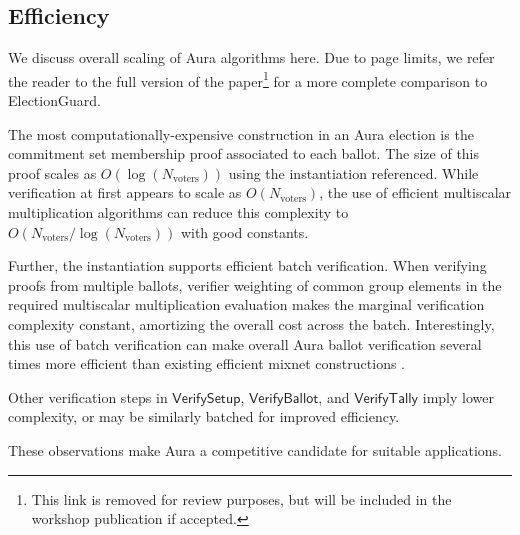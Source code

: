 \documentclass{llncs}
\newcommand{\func}[1]{\mathsf{#1}}
\begin{document}
\subsection{Efficiency}

We discuss overall scaling of Aura algorithms here.
Due to page limits, we refer the reader to the full version of the paper\footnote{This link is removed for review purposes, but will be included in the workshop publication if accepted.} for a more complete comparison to ElectionGuard.

The most computationally-expensive construction in an Aura election is the commitment set membership proof associated to each ballot.
The size of this proof scales as $O(\log(N_{\text{voters}}))$ using the instantiation referenced.
While verification at first appears to scale as $O(N_{\text{voters}})$, the use of efficient multiscalar multiplication algorithms \cite{pippenger} can reduce this complexity to $O(N_{\text{voters}}/\log(N_{\text{voters}}))$ with good constants.

Further, the instantiation supports efficient batch verification.
When verifying proofs from multiple ballots, verifier weighting of common group elements in the required multiscalar multiplication evaluation makes the marginal verification complexity constant, amortizing the overall cost across the batch.
Interestingly, this use of batch verification can make overall Aura ballot verification several times more efficient than existing efficient mixnet constructions \cite{efficient_shuffle,groth_shuffle}.

Other verification steps in $\func{VerifySetup}$, $\func{VerifyBallot}$, and $\func{VerifyTally}$ imply lower complexity, or may be similarly batched for improved efficiency.

These observations make Aura a competitive candidate for suitable applications.




\end{document}
